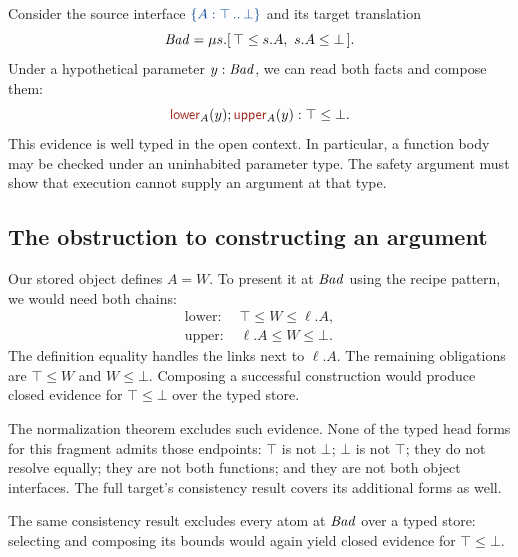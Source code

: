

\label{sec:bad}

Consider the source interface $\iface{\top}{\bot}$ and its target
translation
\[
 \ty{Bad}=\obj{\top\le s.A,\ s.A\le\bot}.
\]
Under a hypothetical parameter $y:\mathit{Bad}$, we can read both facts
and compose them:
\[
 \ev{lower}_A(y);\ev{upper}_A(y):\top\le\bot.
\]
This evidence is well typed in the open context. In particular, a
function body may be checked under an uninhabited parameter type.
The safety argument must show that execution cannot supply an argument
at that type.

\subsection*{The obstruction to constructing an argument}
Our stored object defines $A=W$.
To present it at $\mathit{Bad}$ using the recipe pattern, we would need
both chains:
\[
 \begin{aligned}
 \text{lower: }&\top\le W\le \ell.A,\\
 \text{upper: }&\ell.A\le W\le\bot.
 \end{aligned}
\]
The definition equality handles the links next to $\ell.A$.
The remaining obligations are $\top\le W$ and $W\le\bot$.
Composing a successful construction would produce closed evidence for
$\top\le\bot$ over the typed store.

The normalization theorem excludes such evidence. None of the typed
head forms for this fragment admits those endpoints:
$\top$ is not $\bot$; $\bot$ is not $\top$; they do not resolve equally;
they are not both functions; and they are not both object interfaces.
The full target's consistency result covers its additional forms as well.

The same consistency result excludes every atom at $\mathit{Bad}$ over a
typed store: selecting and composing its bounds would again yield
closed evidence for $\top\le\bot$.

